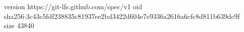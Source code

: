 version https://git-lfs.github.com/spec/v1
oid sha256:3c43c5fdf238835c81937ee2bd3422d604e7e9336a2616a6cfc8d811b639dc9f
size 43840
